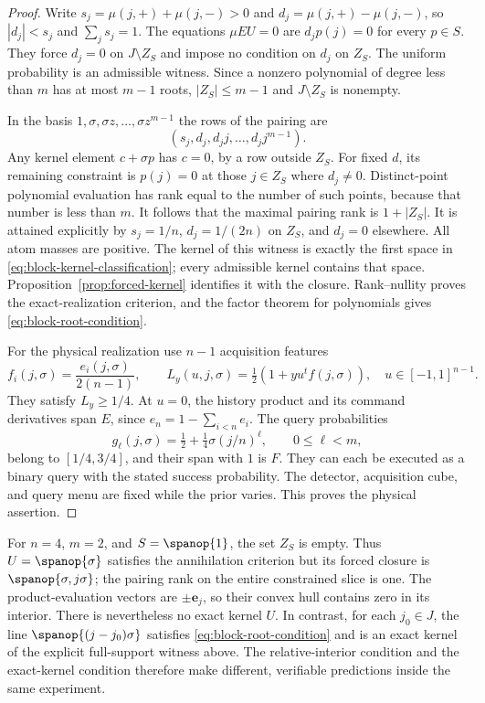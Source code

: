 \begin{proof}
Write $s_j=\mu(j,+)+\mu(j,-)>0$ and
$d_j=\mu(j,+)-\mu(j,-)$, so $|d_j|<s_j$ and $\sum_j s_j=1$.
The equations $\mu E U=0$ are $d_jp(j)=0$ for every $p\in S$.
They force $d_j=0$ on $J\setminus Z_S$ and impose no condition on
$d_j$ on $Z_S$. The uniform probability is an admissible witness.
Since a nonzero polynomial of degree less than $m$ has at most $m-1$
roots, $|Z_S|\le m-1$ and $J\setminus Z_S$ is nonempty.

In the basis $1,\sigma,\sigma z,\ldots,\sigma z^{m-1}$ the rows of
the pairing are
\[
 (s_j,d_j,d_jj,\ldots,d_jj^{m-1}).
\]
Any kernel element $c+\sigma p$ has $c=0$, by a row outside $Z_S$.
For fixed $d$, its remaining constraint is $p(j)=0$ at those $j\in Z_S$
where $d_j\ne0$. Distinct-point polynomial evaluation has rank equal
to the number of such points, because that number is less than $m$.
It follows that the maximal pairing rank is $1+|Z_S|$. It is attained
explicitly by $s_j=1/n$, $d_j=1/(2n)$ on $Z_S$, and $d_j=0$
elsewhere. All atom masses are positive. The kernel of this witness is
exactly the first space in \eqref{eq:block-kernel-classification}; every
admissible kernel contains that space. Proposition~\ref{prop:forced-kernel}
identifies it with the closure. Rank--nullity proves the exact-realization
criterion, and the factor theorem for polynomials gives
\eqref{eq:block-root-condition}.

For the physical realization use $n-1$ acquisition features
\[
 f_i(j,\sigma)=\frac{e_i(j,\sigma)}{2(n-1)},\qquad
 L_y(u,j,\sigma)=\tfrac12(1+y u^tf(j,\sigma)),
 \quad u\in[-1,1]^{n-1}.
\]
They satisfy $L_y\ge1/4$. At $u=0$, the history product and its command
derivatives span $E$, since $e_n=1-\sum_{i<n}e_i$. The query
probabilities
\[
 g_\ell(j,\sigma)=\tfrac12+\tfrac14\sigma(j/n)^\ell,
 \qquad 0\le\ell<m,
\]
belong to $[1/4,3/4]$, and their span with $1$ is $F$. They can each
be executed as a binary query with the stated success probability.
The detector, acquisition cube, and query menu are fixed while the
prior varies. This proves the physical assertion.
\end{proof}

For $n=4$, $m=2$, and $S=\spanop\{1\}$, the set $Z_S$ is empty.
Thus $U=\spanop\{\sigma\}$ satisfies the annihilation criterion but
its forced closure is $\spanop\{\sigma,j\sigma\}$; the pairing rank
on the entire constrained slice is one. The product-evaluation vectors
are $\pm\mathbf e_j$, so their convex hull contains zero in its
interior. There is nevertheless no exact kernel $U$. In contrast, for
each $j_0\in J$, the line $\spanop\{(j-j_0)\sigma\}$ satisfies
\eqref{eq:block-root-condition} and is an exact kernel of the explicit
full-support witness above. The relative-interior condition and the
exact-kernel condition therefore make different, verifiable predictions
inside the same experiment.

